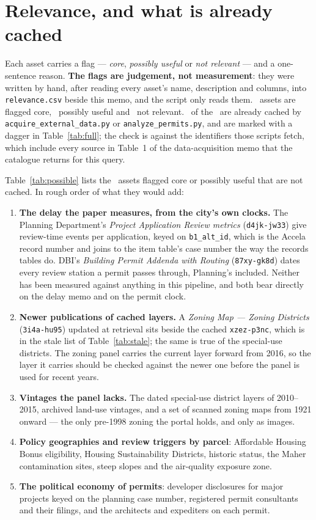 \documentclass[11pt]{article}
\begin{document}
\section{Relevance, and what is already cached}

Each asset carries a flag --- \emph{core}, \emph{possibly useful} or \emph{not relevant} ---
and a one-sentence reason. \textbf{The flags are judgement, not measurement}: they were
written by hand, after reading every asset's name, description and columns, into
\texttt{relevance.csv} beside this memo, and the script only reads them. \catCore\ assets are
flagged core, \catPossible\ possibly useful and \catNotRelevant\ not relevant. \catCached\ of
the \catTotal\ are already cached by \texttt{acquire\_external\_data.py} or
\texttt{analyze\_permits.py}, and are marked with a dagger in Table~\ref{tab:full}; the check
is against the identifiers those scripts fetch, which include every source in Table~1 of the
data-acquisition memo that the catalogue returns for this query.

Table~\ref{tab:possible} lists the \catPossibleNotCached\ assets flagged core or possibly
useful that are not cached. In rough order of what they would add:

\begin{enumerate}
\item \textbf{The delay the paper measures, from the city's own clocks.} The Planning
Department's \emph{Project Application Review metrics} (\texttt{d4jk-jw33}) give review-time
events per application, keyed on \texttt{b1\_alt\_id}, which is the Accela record number and
joins to the item table's case number the way the records tables do. DBI's \emph{Building
Permit Addenda with Routing} (\texttt{87xy-gk8d}) dates every review station a permit passes
through, Planning's included. Neither has been measured against anything in this pipeline,
and both bear directly on the delay memo and on the permit clock.
\item \textbf{Newer publications of cached layers.} A \emph{Zoning Map --- Zoning Districts}
(\texttt{3i4a-hu95}) updated at retrieval sits beside the cached \texttt{xzez-p3nc}, which
is in the stale list of Table~\ref{tab:stale}; the same is true of the special-use
districts. The zoning
panel carries the current layer forward from 2016, so the layer it carries should be checked
against the newer one before the panel is used for recent years.
\item \textbf{Vintages the panel lacks.} The dated special-use district layers of 2010--2015,
archived land-use vintages, and a set of scanned zoning maps from 1921 onward --- the only
pre-1998 zoning the portal holds, and only as images.
\item \textbf{Policy geographies and review triggers by parcel}: Affordable Housing Bonus
eligibility, Housing Sustainability Districts, historic status, the Maher contamination
sites, steep slopes and the air-quality exposure zone.
\item \textbf{The political economy of permits}: developer disclosures for major projects
keyed on the planning case number, registered permit consultants and their filings, and the
architects and expediters on each permit.
\end{enumerate}
\end{document}
